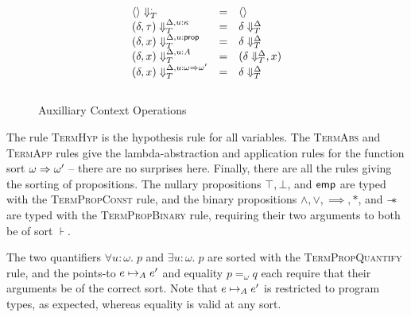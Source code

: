 \begin{figure}
\begin{displaymath}
\begin{array}{lcl}
\restrictvals{\cdot}{\unit}                     & = & \unit                             \\ 
\restrictvals{\Delta, u:\kappa}{(\delta, \tau)} & = & \restrictvals{\Delta}{\delta}      \\
\restrictvals{\Delta, u:\assert}{(\delta, x)}   & = & \restrictvals{\Delta}{\delta}      \\
\restrictvals{\Delta, u:A}{(\delta, x)}         & = & (\restrictvals{\Delta}{\delta}, x) \\
\restrictvals{\Delta, u:\omega \To \omega'}{(\delta, x)} &=& \restrictvals{\Delta}{\delta} \\[1em]
\end{array}
\end{displaymath}
\caption{Auxilliary Context Operations}
\label{context-ops}  
\end{figure}

The rule \textsc{TermHyp} is the hypothesis rule for all variables.
% 
% 
The \textsc{TermAbs} and \textsc{TermApp} rules give the
lambda-abstraction and application rules for the function sort $\omega
\To \omega'$ -- there are no surprises here. Finally, there are all
the rules giving the sorting of propositions. The nullary propositions
$\top, \bot$, and $\emp$ are typed with the \textsc{TermPropConst}
rule, and the binary propositions $\land, \vee, \implies, *$, and
$\wand$ are typed with the \textsc{TermPropBinary} rule, requiring
their two arguments to both be of sort $\assert$.


The two quantifiers $\forall u:\omega.\;p$ and $\exists u:\omega.\;p$
are sorted with the \textsc{TermPropQuantify} rule, and the points-to
$e \pointsto_A e'$ and equality $p =_\omega q$ each require that their 
arguments be of the correct sort. Note that $e \pointsto_A e'$ is
restricted to program types, as expected, whereas equality is valid
at any sort. 

